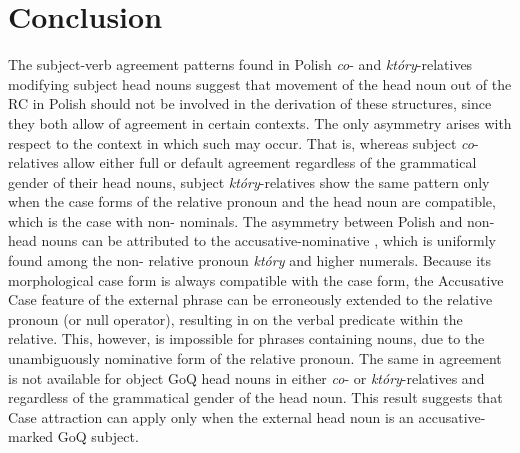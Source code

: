 \documentclass[output=paper]{langsci/langscibook}
\begin{document}
\section{Conclusion}%

The subject-verb agreement patterns found in Polish \textit{co}{}- and \textit{który}{}-relatives modifying subject head nouns suggest that movement of the head noun out of the RC in Polish should not be involved in the derivation of these structures, since they both allow  of agreement in certain contexts. The only asymmetry arises with respect to the context in which such  may occur. That is, whereas subject \textit{co}{}-relatives allow either full or default agreement regardless of the grammatical gender of their head nouns, subject \textit{który}{}-relatives show the same pattern only when the case forms of the relative pronoun and the  head noun are compatible, which is the case with non- nominals. The asymmetry between Polish  and non- head nouns can be attributed to the accusative-nominative , which is uniformly found among the non- relative pronoun \textit{który} and higher numerals. Because its morphological case form is always compatible with the  case form, the Accusative Case feature of the external  phrase can be erroneously extended to the relative pronoun (or null operator), resulting in  on the verbal predicate within the relative. This, however, is impossible for  phrases containing  nouns, due to the unambiguously nominative form of the  relative pronoun. The same  in agreement is not available for object GoQ head nouns in either \textit{co}{}- or \textit{który}{}-relatives and regardless of the grammatical gender of the head noun. This result suggests that Case attraction can apply only when the external head noun is an accusative-marked GoQ subject.

\sloppy
\printbibliography[heading=subbibliography,notkeyword=this] 
\end{document}
